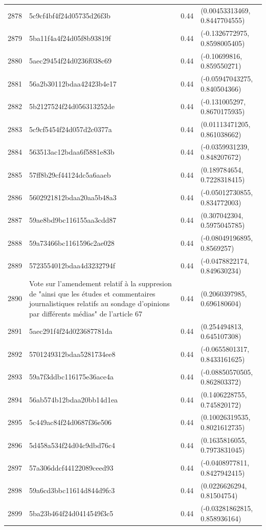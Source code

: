 \begin{table}[ht]
\begin{tabular}{rlrl}
  2878 & 5c9cf4bf4f24d05735d26f3b & 0.44 & (0.00453313469, 0.8447704555) \\ 
  2879 & 5ba11f4a4f24d05f8b93819f & 0.44 & (-0.1326772975, 0.8598005405) \\ 
  2880 & 5aec29454f24d0236f038c69 & 0.44 & (-0.10699816, 0.859550271) \\ 
  2881 & 56a2b30112bdaa42423b4e17 & 0.44 & (-0.05947043275, 0.840504366) \\ 
  2882 & 5b2127524f24d056313252de & 0.44 & (-0.131005297, 0.8670175935) \\ 
  2883 & 5c9cf5454f24d057d2c0377a & 0.44 & (0.01113471205, 0.861038662) \\ 
  2884 & 563513ac12bdaa6f5881e83b & 0.44 & (-0.0359931239, 0.848207672) \\ 
  2885 & 57ff8b29cf44124dc5a6aaeb & 0.44 & (0.189784654, 0.7228318415) \\ 
  2886 & 5602921812bdaa20aa5b48a3 & 0.44 & (-0.05012730855, 0.834772003) \\ 
  2887 & 59ae8bd9bc116155aa3cdd87 & 0.44 & (0.307042304, 0.5975045785) \\ 
  2888 & 59a73466bc1161596c2ae028 & 0.44 & (-0.08049196895, 0.8569257) \\ 
  2889 & 5723554012bdaa4d3232794f & 0.44 & (-0.0478822174, 0.849630234) \\ 
  2890 & Vote sur l'amendement relatif à la suppresion de "ainsi que les études et commentaires journalistiques relatifs au sondage d’opinions par différents médias" de l'article 67 & 0.44 & (0.2060397985, 0.696180604) \\ 
  2891 & 5aec291f4f24d023687781da & 0.44 & (0.254494813, 0.645107308) \\ 
  2892 & 5701249312bdaa5281734ee8 & 0.44 & (-0.0655801317, 0.8433161625) \\ 
  2893 & 59a7f3ddbc116175e36ace4a & 0.44 & (-0.08850570505, 0.862803372) \\ 
  2894 & 56ab574b12bdaa20bb14d1ea & 0.44 & (0.1406228755, 0.745820172) \\ 
  2895 & 5c449ac84f24d0687f36e506 & 0.44 & (0.10026319535, 0.8021612735) \\ 
  2896 & 5d458a534f24d04c9dbd76c4 & 0.44 & (0.1635816055, 0.7973831045) \\ 
  2897 & 57a306ddcf44122089ceed93 & 0.44 & (-0.0408977811, 0.8427942415) \\ 
  2898 & 59a6cd3bbc11614d844d9fc3 & 0.44 & (0.0226626294, 0.81504754) \\ 
  2899 & 5ba23b464f24d0414549f3c5 & 0.44 & (-0.03281862815, 0.858936164) \\ 

\end{tabular}
\end{table}
